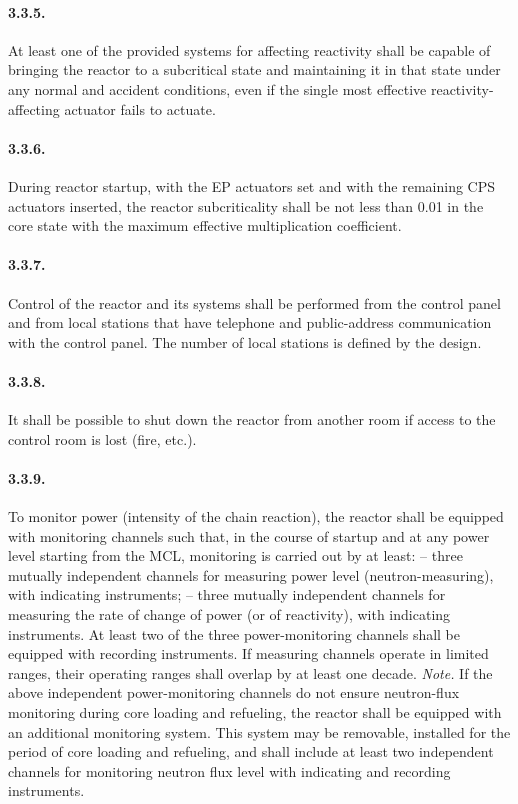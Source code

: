 \documentclass[openright]{bookest}
\begin{document}
\paragraph{3.3.5.} At least one of the provided systems for affecting reactivity shall be capable of bringing the reactor to a subcritical state and maintaining it in that state under any normal and accident conditions, even if the single most effective reactivity-affecting actuator fails to actuate.

\paragraph{3.3.6.} During reactor startup, with the EP actuators set and with the remaining CPS actuators inserted, the reactor subcriticality shall be not less than \num{0.01} in the core state with the maximum effective multiplication coefficient.

\paragraph{3.3.7.} Control of the reactor and its systems shall be performed from the control panel and from local stations that have telephone and public-address communication with the control panel. The number of local stations is defined by the design.

\paragraph{3.3.8.} It shall be possible to shut down the reactor from another room if access to the control room is lost (fire, etc.).

\paragraph{3.3.9.} To monitor power (intensity of the chain reaction), the reactor shall be equipped with monitoring channels such that, in the course of startup and at any power level starting from the MCL, monitoring is carried out by at least:
-- three mutually independent channels for measuring power level (neutron-measuring), with indicating instruments;
-- three mutually independent channels for measuring the rate of change of power (or of reactivity), with indicating instruments.
At least two of the three power-monitoring channels shall be equipped with recording instruments. If measuring channels operate in limited ranges, their operating ranges shall overlap by at least one decade.
\emph{Note.} If the above independent power-monitoring channels do not ensure neutron-flux monitoring during core loading and refueling, the reactor shall be equipped with an additional monitoring system. This system may be removable, installed for the period of core loading and refueling, and shall include at least two independent channels for monitoring neutron flux level with indicating and recording instruments.
\end{document}
